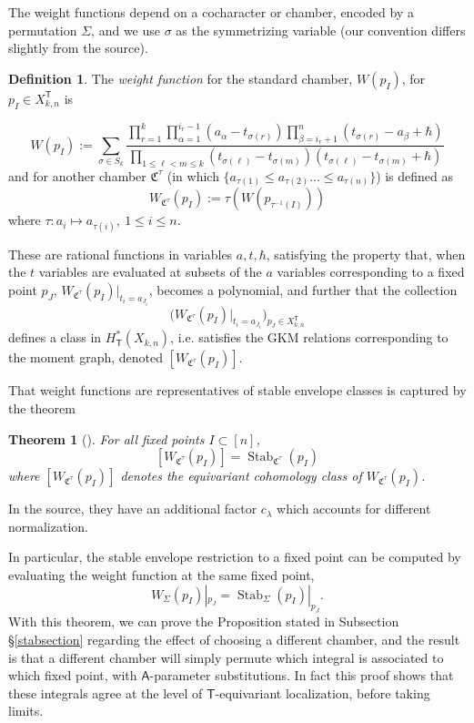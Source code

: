 \documentclass[12 pt]{article}
\theoremstyle{plain}
\newtheorem{theorem}{Theorem}[section]
\theoremstyle{plain}
\theoremstyle{plain}
\theoremstyle{plain}
\theoremstyle{plain}
\theoremstyle{plain}
\theoremstyle{plain}
\theoremstyle{plain}
\theoremstyle{plain}
\theoremstyle{plain}
\theoremstyle{remark}
\theoremstyle{remark}
\theoremstyle{definition}
\newtheorem{definition}{Definition}[section]
\theoremstyle{definition}
\theoremstyle{definition}
\theoremstyle{definition}
\theoremstyle{definition}
\theoremstyle{definition}
\DeclareMathOperator{\Stab}{Stab}
\newcommand{\bT}{\mathsf{T}}
\newcommand{\bA}{\mathsf{A}}
\newcommand{\chamb}{\mathfrak{C}}
\begin{document}
The weight functions depend on a cocharacter or chamber, encoded by a permutation $\Sigma$, and we use $\sigma$ as the symmetrizing variable (our convention differs slightly from the source).

\begin{definition}
The \textit{weight function} for the standard chamber, $W(p_I)$, for $p_I\in X_{k,n}^\bT$ is 

\[
W(p_I):=\sum\limits_{\sigma \in S_k}\dfrac{\prod\limits_{r = 1}^k \prod\limits_{\alpha = 1}^{i_{r} - 1} (a_{\alpha} - t_{\sigma(r)}) \prod\limits_{\beta = i_r + 1}^n (t_{\sigma(r)} - a_{\beta} + \hbar) }{\prod\limits_{1 \leq \ell < m \leq k} (t_{\sigma(\ell)} - t_{\sigma(m)}) (t_{\sigma (\ell)} - t_{\sigma(m)} + \hbar)}
\]
and for another chamber $\chamb^\tau$ (in which $\{a_{\tau(1)}\leq a_{\tau(2)}\dots\leq a_{\tau(n)}\}$) is defined as
\[
W_{\chamb^\tau}(p_{I}):=\tau\left(W\left(p_{\tau^{-1}(I)}\right)\right)
\]
where $\tau:a_{i}\mapsto a_{\tau(i)},\ 1\leq i\leq n$.
\end{definition}

These are rational functions in variables $a,t,\hbar$, satisfying the property that, when the $t$ variables are evaluated at subsets of the $a$ variables corresponding to a fixed point $p_J$, $W_{\chamb^\tau}(p_I)|_{t_i=a_{J_i}}$, becomes a polynomial, and further that the collection 
\[
\big(W_{\chamb^\tau}(p_I)|_{t_i=a_{J_i}}\big)_{p_J\in X_{k,n}^\bT}
\]
defines a class in $H_\bT^*(X_{k,n})$, i.e. satisfies the GKM relations corresponding to the moment graph, denoted $[W_{\chamb^\tau}(p_I)]$.  

That weight functions are representatives of stable envelope classes is captured by the theorem

\begin{theorem}[\cite{RTV}]\label{weight-fcns-stab}
For all fixed points $I\subset [n]$, 
$$
[W_{\chamb^\tau}(p_I)]=\Stab_{\chamb^\tau}(p_I)
$$
where $[W_{\chamb^\tau}(p_I)]$ denotes the equivariant cohomology class of $W_{\chamb^\tau}(p_I)$. 
\end{theorem}
In the source, they have an additional factor $c_\lambda$ which accounts for different normalization. 

In particular, the stable envelope restriction to a fixed point can be computed by evaluating the weight function at the same fixed point,
\[
W_\Sigma(p_I)|_{p_J} = \Stab_\Sigma(p_I)|_{p_J}.
\]
With this theorem, we can prove the Proposition stated in Subsection \S\ref{stabsection} regarding the effect of choosing a different chamber, and the result is that a different chamber will simply permute which integral is associated to which fixed point, with $\bA$-parameter substitutions. In fact this proof shows that these integrals agree at the level of $\bT$-equivariant localization, before taking limits. 
\end{document}
